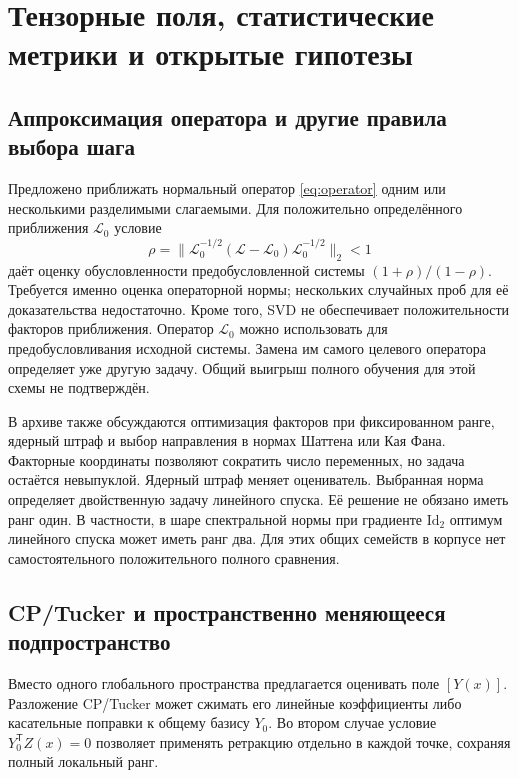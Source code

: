 \documentclass[11pt,a4paper]{article}
\numberwithin{equation}{section}
\newcommand{\Id}{\mathrm{Id}}
\newcommand{\T}{^{\mathsf T}}
\begin{document}
\section{Тензорные поля, статистические метрики и открытые гипотезы}
\label{sec:open}

\subsection{Аппроксимация оператора и другие правила выбора шага}

Предложено приближать нормальный оператор \eqref{eq:operator}
одним или несколькими разделимыми слагаемыми. Для положительно
определённого приближения $\mathcal L_0$ условие
\[
 \rho=\|\mathcal L_0^{-1/2}(\mathcal L-\mathcal L_0)
                     \mathcal L_0^{-1/2}\|_2<1
\]
даёт оценку обусловленности предобусловленной системы
$(1+\rho)/(1-\rho)$. Требуется именно оценка операторной нормы;
нескольких случайных проб для её доказательства недостаточно.
Кроме того, SVD не обеспечивает положительности факторов приближения.
Оператор $\mathcal L_0$ можно использовать для предобусловливания
исходной системы. Замена им самого целевого оператора определяет
уже другую задачу. Общий выигрыш полного обучения для этой схемы
не подтверждён.
\cite{unified}

В архиве также обсуждаются оптимизация факторов при фиксированном
ранге, ядерный штраф и выбор направления в нормах Шаттена или Кая Фана.
Факторные координаты позволяют сократить число переменных,
но задача остаётся невыпуклой. Ядерный штраф меняет оцениватель.
Выбранная норма определяет двойственную задачу линейного спуска.
Её решение не обязано иметь ранг один. В частности,
в шаре спектральной нормы при градиенте $\Id_2$ оптимум линейного
спуска может иметь ранг два. Для этих общих семейств в корпусе
нет самостоятельного положительного полного сравнения.
\cite{svd,glmcheck}

\subsection{CP/Tucker и пространственно меняющееся подпространство}

Вместо одного глобального пространства предлагается оценивать
поле $[Y(x)]$. Разложение CP/Tucker может сжимать его линейные
коэффициенты либо касательные поправки к общему базису $Y_0$.
Во втором случае условие $Y_0\T Z(x)=0$ позволяет применять
ретракцию отдельно в каждой точке, сохраняя полный локальный ранг.
\end{document}
